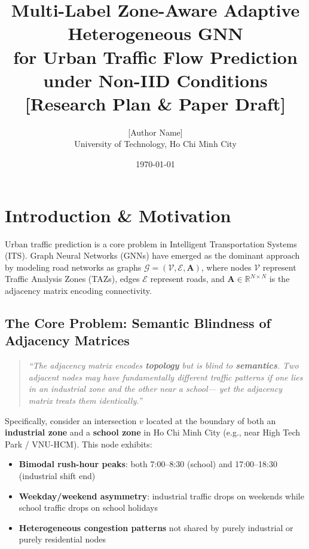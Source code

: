 \documentclass[12pt,a4paper]{article}
\title{\textbf{Multi-Label Zone-Aware Adaptive Heterogeneous GNN\\
for Urban Traffic Flow Prediction under Non-IID Conditions}\\[0.5em]
\large{[Research Plan \& Paper Draft]}}
\author{[Author Name] \\ University of Technology, Ho Chi Minh City}
\date{\today}
\begin{document}
\maketitle
\tableofcontents
\newpage

\section{Introduction \& Motivation}

Urban traffic prediction is a core problem in Intelligent Transportation Systems (ITS).
Graph Neural Networks (GNNs) have emerged as the dominant approach by modeling road
networks as graphs $\mathcal{G} = (\mathcal{V}, \mathcal{E}, \mathbf{A})$, where nodes
$\mathcal{V}$ represent Traffic Analysis Zones (TAZs), edges $\mathcal{E}$ represent roads, and
$\mathbf{A} \in \mathbb{R}^{N \times N}$ is the adjacency matrix encoding connectivity.

\subsection{The Core Problem: Semantic Blindness of Adjacency Matrices}

\begin{quote}
\textit{``The adjacency matrix encodes \textbf{topology} but is blind to
\textbf{semantics}. Two adjacent nodes may have fundamentally different
traffic patterns if one lies in an industrial zone and the other near a school---
yet the adjacency matrix treats them identically.''}
\end{quote}

Specifically, consider an intersection $v$ located at the boundary of both an
\textbf{industrial zone} and a \textbf{school zone} in Ho Chi Minh City (e.g., near
High Tech Park / VNU-HCM). This node exhibits:

\begin{itemize}
    \item \textbf{Bimodal rush-hour peaks}: both 7:00--8:30 (school) and
          17:00--18:30 (industrial shift end)
    \item \textbf{Weekday/weekend asymmetry}: industrial traffic drops on
          weekends while school traffic drops on school holidays
    \item \textbf{Heterogeneous congestion patterns} not shared by purely
          industrial or purely residential nodes
\end{itemize}
\end{document}
